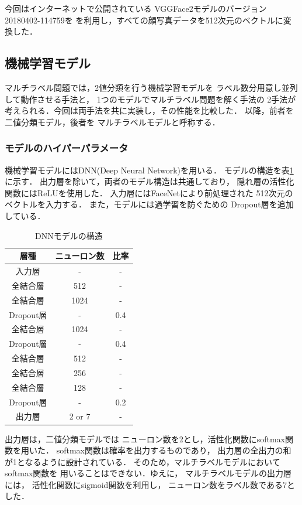 今回はインターネットで公開されている
VGGFace2モデルのバージョン20180402-114759\cite{face-net}を
を利用し，すべての顔写真データを512次元のベクトルに変換した．
\subsection{機械学習モデル}
マルチラベル問題では，2値分類を行う機械学習モデルを
ラベル数分用意し並列して動作させる手法と，
1つのモデルでマルチラベル問題を解く手法の
2手法が考えられる．今回は両手法を共に実装し，その性能を比較した．
以降，前者を二値分類モデル，後者を
マルチラベルモデルと呼称する．

\subsubsection{モデルのハイパーパラメータ}
機械学習モデルにはDNN(Deep Neural Network)を用いる．
モデルの構造を表\ref{tab:ch2:model}に示す．
出力層を除いて，両者のモデル構造は共通しており，
隠れ層の活性化関数にはReLUを使用した．
入力層にはFaceNetにより前処理された
512次元のベクトルを入力する．
また，モデルには過学習を防ぐための
Dropout層を追加している．
\begin{table}[tb]
  \caption{DNNモデルの構造
  \label{tab:ch2:model}}
  \centering
  \begin{tabular}{c|cc}
  \hline
  層種       & ニューロン数 & 比率  \\ \hline
  入力層      & -      & -   \\
  全結合層     & 512    & -   \\
  全結合層     & 1024   & -   \\
  Dropout層 & -      & 0.4 \\
  全結合層     & 1024   & -   \\
  Dropout層 & -      & 0.4 \\
  全結合層     & 512    & -   \\
  全結合層     & 256    & -   \\
  全結合層     & 128    & -   \\
  Dropout層 & -      & 0.2 \\
  出力層      & 2 or 7 & -   \\ \hline
  \end{tabular}
\end{table}

出力層は，二値分類モデルでは
ニューロン数を2とし，活性化関数にsoftmax関数を用いた．
softmax関数は確率を出力するものであり，
出力層の全出力の和が1となるように設計されている．
そのため，マルチラベルモデルにおいてsoftmax関数を
用いることはできない．ゆえに，
マルチラベルモデルの出力層には，
活性化関数にsigmoid関数を利用し，
ニューロン数をラベル数である7とした．

